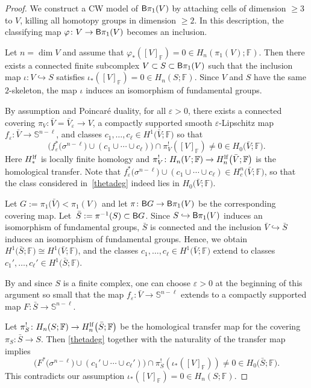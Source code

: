 \documentclass[10pt,a4paper]{amsart}
\numberwithin{equation}{section}
\newcommand{\F}{\mathbb{F}}
\newcommand{\SSS}{\mathbb{S}}
\newcommand{\eps}{\varepsilon}
\begin{document}
\begin{proof}
We construct a CW model of ${\sf B}\pi_1(V)$ by attaching cells of dimension $\geq 3$ to $V$, killing all homotopy groups in dimension $\geq 2$.
In this description, the classifying map $\varphi \colon V \to {\sf B}\pi_1(V)$ becomes an inclusion.

Let $n = \dim V$ and assume that $\varphi_*([V]_\F) = 0 \in H_n ( \pi_1(V) ; \F)$.
Then there exists a connected finite subcomplex $V \subset S \subset {\sf B}\pi_1(V)$ such that the inclusion map $\iota \colon V \hookrightarrow S$ satisfies $\iota_*([V]_{\F}) =0 \in H_n(S; \F)$.
Since $V$ and $S$ have the same $2$-skeleton, the map $\iota$ induces an isomorphism of fundamental groups.

By assumption and Poincar\'e duality, for all $\varepsilon > 0$, there exists a connected covering $\pi_V \colon \bar V = \bar V_\eps \to V$, a compactly supported smooth $\eps$-Lipschitz map $f_\eps \colon \bar V \to \SSS^{n-\ell}$, and classes $c_1, \ldots , c_{\ell} \in H^1\big(\bar V; \F\big)$ so that
\begin{equation} \label{thetadeg}
 \big( f_\eps^*\big(\sigma^{n-\ell}\big) \cup (c_1 \cup \cdots \cup c_\ell ) \big) \cap \pi_V^!( [V]_{\F}) \neq 0 \in H_0 \big( \bar V; \F\big) .
\end{equation}
 Here $H_*^{\rm lf}$ is locally finite homology and $\pi_V^{!} \colon H_n(V ; \F) \to H^{\rm lf}_n\big( \bar V; \F\big)$ is the homological transfer.
Note that $f_\eps^*\big(\sigma^{n-\ell}\big) \cup (c_1 \cup \cdots \cup c_\ell ) \in H_c^n\big( \bar V; \F\big)$, so that the class considered in~\eqref{thetadeg} indeed lies in $H_0\big(\bar V; \F\big)$.

 Let $G := \pi_1\big(\bar V\big) < \pi_1(V)$ and let $\pi \colon {\sf B}G \to {\sf B}\pi_1(V)$ be the corresponding covering map.
Let~${\bar S := \pi^{-1}(S) \subset {\sf B}G}$.
Since $S \hookrightarrow {\sf B}\pi_1(V)$ induces an isomorphism of fundamental groups, $\bar S$ is connected and the inclusion $\bar V \hookrightarrow \bar S$ induces an isomorphism of fundamental groups.
Hence, we obtain $H^1\big(\bar S; \F\big) \cong H^1\big(\bar V; \F\big)$, and the classes $c_1, \ldots, c_\ell \in H^1\big(\bar V; \F\big)$ extend to classes $c_1', \ldots, c_\ell' \in H^1\big(\bar S; \F\big)$.

By \cite[Lemma 3.2]{BH10} and since $S$ is a finite complex, one can choose $\eps > 0$ at the beginning of this argument so small that the map $f_\eps \colon \bar V \to \SSS^{n-\ell}$ extends to a compactly supported map $F \colon \bar S \to \SSS^{n-\ell}$.

Let $\pi_S^! \colon H_n(S; \F) \to H^{\rm lf}_n\big(\bar S; \F\big)$ be the homological transfer map for the covering $\pi_S \colon \bar S \to S$.
Then \eqref{thetadeg} together with the naturality of the transfer map implies
\[
 \big( F^*\big(\sigma^{n-\ell}\big) \cup ( c_1' \cup \cdots \cup c_\ell') \big) \cap \pi_S^!(\iota_*( [V]_{\F})) \neq 0 \in H_0\big(\bar S; \F\big) .
\]
This contradicts our assumption $\iota_*([V]_\F) = 0 \in H_n(S; \F)$.
\end{proof}
\end{document}
